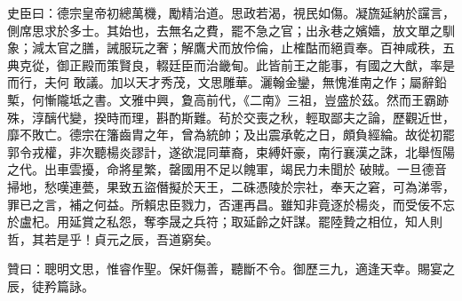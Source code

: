 \begin{pinyinscope}
 史臣曰：德宗皇帝初總萬機，勵精治道。思政若渴，視民如傷。凝旒延納於讜言，側席思求於多士。其始也，去無名之費，罷不急之官；出永巷之嬪嬙，放文單之馴象；減太官之膳，誡服玩之奢；解鷹犬而放伶倫，止榷酤而絕貢奉。百神咸秩，五典克從，御正殿而策賢良，輟廷臣而治畿甸。此皆前王之能事，有國之大猷，率是而行，夫何
 敢議。加以天才秀茂，文思雕華。灑翰金鑾，無愧淮南之作；屬辭鉛槧，何慚隴坻之書。文雅中興，夐高前代，《二南》三祖，豈盛於茲。然而王霸跡殊，淳醨代變，揆時而理，斟酌斯難。茍於交喪之秋，輕取鄙夫之論，歷觀近世，靡不敗亡。德宗在籓齒胄之年，曾為統帥；及出震承乾之日，頗負經綸。故從初罷郭令戎權，非次聽楊炎謬計，遂欲混同華裔，束縛奸豪，南行襄漢之誅，北舉恆陽之代。出車雲擾，命將星繁，罄國用不足以餽軍，竭民力未聞於
 破賊。一旦德音掃地，愁嘆連甍，果致五盜僭擬於天王，二硃憑陵於宗社，奉天之窘，可為涕零，罪已之言，補之何益。所賴忠臣戮力，否運再昌。雖知非竟逐於楊炎，而受佞不忘於盧杞。用延賞之私怨，奪李晟之兵符；取延齡之奸謀。罷陸贄之相位，知人則哲，其若是乎！貞元之辰，吾道窮矣。



 贊曰：聰明文思，惟睿作聖。保奸傷善，聽斷不令。御歷三九，適逢天幸。賜宴之辰，徒矜篇詠。



\end{pinyinscope}